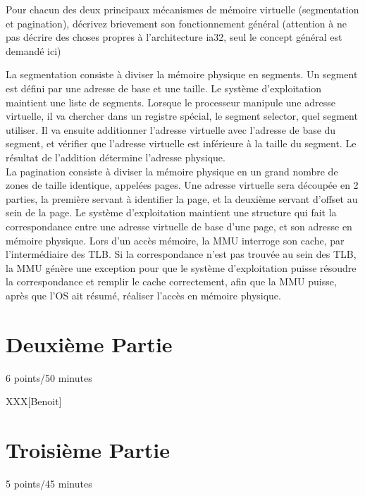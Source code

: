 Pour chacun des deux principaux m\'ecanismes de m\'emoire virtuelle
(segmentation et pagination), d\'ecrivez brievement son fonctionnement
g\'en\'eral (attention \`a ne pas d\'ecrire des choses propres \`a
l'architecture ia32, seul le concept g\'en\'eral est demand\'e ici)

\begin{correction}

La segmentation consiste \`a diviser la m\'emoire physique en segments. Un
segment est d\'efini par une adresse de base et une taille. Le syst\`eme
d'exploitation maintient une liste de segments. Lorsque le processeur manipule
une adresse virtuelle, il va chercher dans un registre sp\'ecial, le segment
selector, quel segment utiliser. Il va ensuite additionner l'adresse virtuelle
avec l'adresse de base du segment, et v\'erifier que l'adresse virtuelle est
inf\'erieure \`a la taille du segment. Le r\'esultat de l'addition d\'etermine
l'adresse physique.\\

La pagination consiste \`a diviser la m\'emoire physique en un grand nombre de
zones de taille identique, appel\'ees pages. Une adresse virtuelle sera
d\'ecoup\'ee en 2 parties, la premi\`ere servant \`a identifier la page, et la
deuxi\`eme servant d'offset au sein de la page. Le syst\`eme d'exploitation
maintient une structure qui fait la correspondance entre une adresse virtuelle
de base d'une page, et son adresse en m\'emoire physique. Lors d'un acc\`es
m\'emoire, la MMU interroge son cache, par l'interm\'ediaire des TLB. Si la
correspondance n'est pas trouv\'ee au sein des TLB, la MMU g\'en\`ere une
exception pour que le syst\`eme d'exploitation puisse r\'esoudre la
correspondance et remplir le cache correctement, afin que la MMU puisse,
apr\`es que l'OS ait r\'esum\'e, r\'ealiser l'acc\`es en m\'emoire physique.

\end{correction}



%
%

\section{Deuxi\`eme Partie}
{\hfill{} \scriptsize{6 points/50 minutes}}

XXX[Benoit]

%
%

\section{Troisi\`eme Partie}
{\hfill{} \scriptsize{5 points/45 minutes}}

